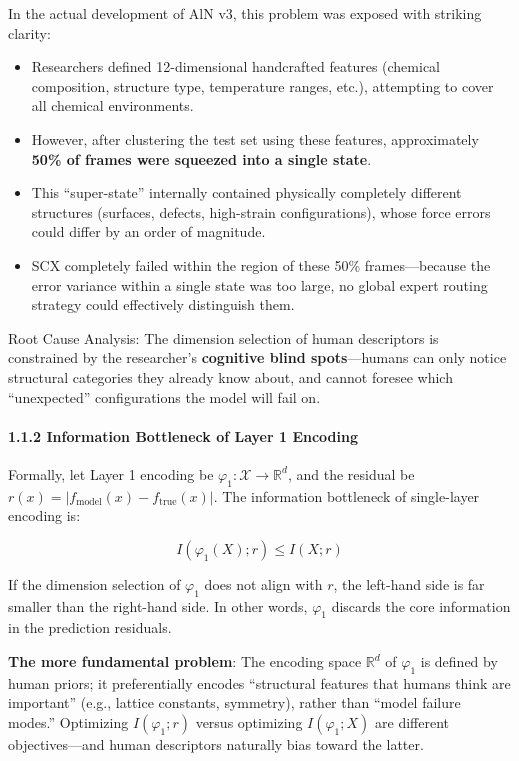 \documentclass[
  12pt,
]{article}
\providecommand{\tightlist}{%
  \setlength{\itemsep}{0pt}\setlength{\parskip}{0pt}}
\begin{document}
In the actual development of AlN v3, this problem was exposed with striking clarity:

\begin{itemize}
\tightlist
\item
  Researchers defined 12-dimensional handcrafted features (chemical composition, structure type, temperature ranges, etc.), attempting to cover all chemical environments.
\item
  However, after clustering the test set using these features, approximately \textbf{50\% of frames were squeezed into a single state}.
\item
  This ``super-state'' internally contained physically completely different structures (surfaces, defects, high-strain configurations), whose force errors could differ by an order of magnitude.
\item
  SCX completely failed within the region of these 50\% frames---because the error variance within a single state was too large, no global expert routing strategy could effectively distinguish them.
\end{itemize}

Root Cause Analysis: The dimension selection of human descriptors is constrained by the researcher's \textbf{cognitive blind spots}---humans can only notice structural categories they already know about, and cannot foresee which ``unexpected'' configurations the model will fail on.

\paragraph{1.1.2 Information Bottleneck of Layer 1 Encoding}\label{information-bottleneck-of-layer-1-encoding}

Formally, let Layer 1 encoding be $\varphi_1: \mathcal{X} \rightarrow \mathbb{R}^d$, and the residual be $r(x) = |f_{\text{model}}(x) - f_{\text{true}}(x)|$. The information bottleneck of single-layer encoding is:

\[I(\varphi_1(X); r) \leq I(X; r)\]

If the dimension selection of $\varphi_1$ does not align with $r$, the left-hand side is far smaller than the right-hand side. In other words, $\varphi_1$ discards the core information in the prediction residuals.

\textbf{The more fundamental problem}: The encoding space $\mathbb{R}^d$ of $\varphi_1$ is defined by human priors; it preferentially encodes ``structural features that humans think are important'' (e.g., lattice constants, symmetry), rather than ``model failure modes.'' Optimizing $I(\varphi_1; r)$ versus optimizing $I(\varphi_1; X)$ are different objectives---and human descriptors naturally bias toward the latter.
\end{document}
